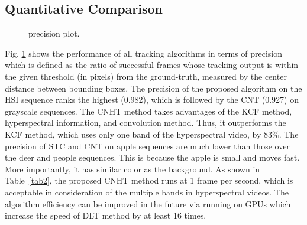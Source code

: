 \documentclass[runningheads,a4paper]{llncs}
\begin{document}
\subsection{Quantitative Comparison}
\begin{figure}[t]
\centering
     \caption{precision plot.}\label{precision plot}
\end{figure}

\begin{table}[t]
\caption{Precision and FPS}\label{tab2}
\centering
{}
\end{table}

Fig. \ref{precision plot} shows the performance of all tracking algorithms in terms of precision which is defined as the ratio of successful frames whose tracking output is within the given threshold (in pixels) from the ground-truth, measured by the center distance between bounding boxes. The precision of the proposed algorithm on the HSI sequence ranks the highest (0.982), which is followed by the CNT (0.927) on grayscale sequences. The CNHT method takes advantages of the KCF method, hyperspectral information, and convolution method. Thus, it outperforms the KCF method, which uses only one band of the hyperspectral video, by 83$\%$. The precision of STC and CNT on apple sequences are much lower than those over the deer and people sequences. This is because the apple is small and moves fast. More importantly, it has similar color as the background. As shown in Table~\ref{tab2}, the proposed CNHT method runs at 1 frame per second, which is acceptable in consideration of the multiple bands in hyperspectral videos. The algorithm efficiency can be improved in the future via running on GPUs which increase the speed of DLT method by at least 16 times.
\end{document}
